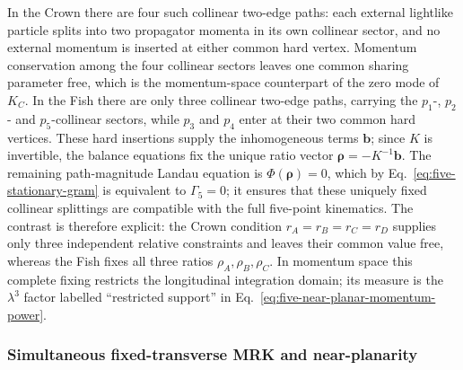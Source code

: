 \documentclass[a4paper,11pt]{article}
\begin{document}
In the Crown there are four such collinear two-edge paths: each external
lightlike particle splits into two propagator momenta in its own collinear
sector, and no external momentum is inserted at either common hard vertex.
Momentum conservation among the four collinear sectors leaves one common
sharing parameter free, which is the momentum-space counterpart of the zero
mode of \(K_C\).  In the Fish there are only three collinear two-edge paths,
carrying the \(p_1\)-, \(p_2\)- and \(p_5\)-collinear sectors, while \(p_3\)
and \(p_4\) enter at their two common hard vertices.  These hard insertions
supply the inhomogeneous terms \(\boldsymbol b\); since \(K\) is invertible,
the balance equations fix the unique ratio vector
\(\boldsymbol\rho=-K^{-1}\boldsymbol b\).  The remaining path-magnitude
Landau equation is \(\Phi(\boldsymbol\rho)=0\), which by
Eq.~\eqref{eq:five-stationary-gram} is equivalent to \(\Gamma_5=0\); it
ensures that these uniquely fixed collinear splittings are compatible with
the full five-point kinematics.
The contrast is therefore explicit: the Crown condition
\(r_A=r_B=r_C=r_D\) supplies only three independent relative constraints and
leaves their common value free, whereas the Fish fixes all three ratios
\(\rho_A,\rho_B,\rho_C\).  In momentum space this complete fixing restricts
the longitudinal integration domain; its measure is the \(\lambda^3\) factor
labelled ``restricted support'' in Eq.~\eqref{eq:five-near-planar-momentum-power}.

\subsubsection{Simultaneous fixed-transverse MRK and near-planarity}
\label{sec:five-point-mrk-planar}
\end{document}
